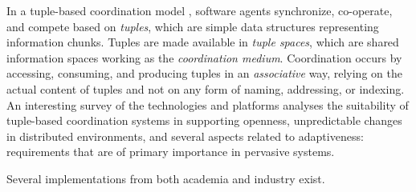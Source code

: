\documentclass[12pt,a4paper,twoside,openright]{book}
\begin{document}
In a tuple-based coordination model \cite{coordbook2001--ch04}, software agents synchronize, co-operate, and compete based on \emph{tuples}, which are simple data structures representing information chunks.
%
Tuples are made available in \emph{tuple spaces}, which are shared information spaces working as the \emph{coordination medium}.
%
Coordination occurs by accessing, consuming, and producing tuples in an \emph{associative} way, relying on the actual content of tuples and not on any form of naming, addressing, or indexing.
%
An interesting survey of the technologies and platforms \cite{adaptivenesslinda-esoaI} analyses the suitability of tuple-based coordination systems in supporting openness, unpredictable changes in distributed environments, and several aspects related to adaptiveness: requirements that are of primary importance in pervasive systems.

Several implementations from both academia and industry exist.
\end{document}
